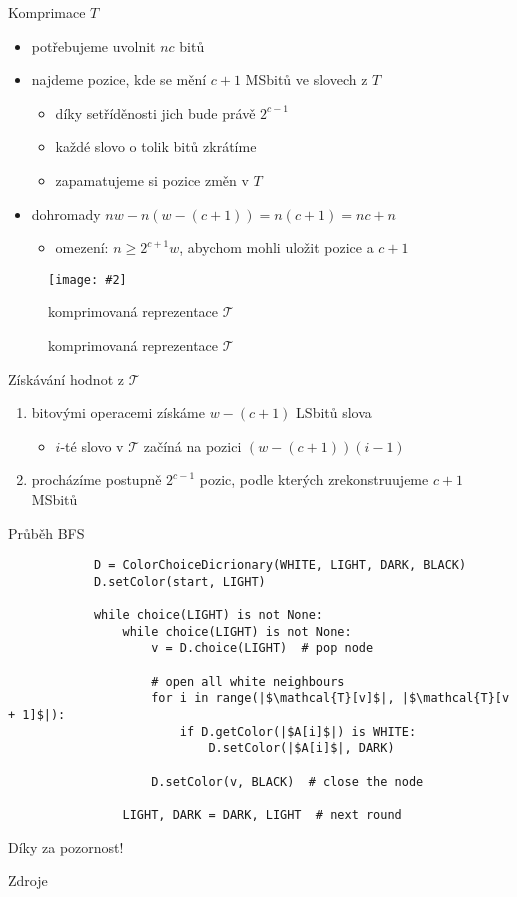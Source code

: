 \documentclass{beamer}
\makeatletter
\newcommand{\fitimage}[2][\@nil]{
	\begin{figure}
		\begin{adjustbox}{width=0.9\textwidth, totalheight=\textheight-2\baselineskip-2\baselineskip,keepaspectratio}
			\texttt{[image: \#2]}
		\end{adjustbox}
		\def\tmp{#1}%
	 \ifx\tmp\@nnil
			\else
			\caption{#1}
		\fi
	\end{figure}
}
\makeatother
\begin{document}
	\begin{frame}{Komprimace $T$}
		\begin{itemize}
			\item potřebujeme uvolnit $nc$ bitů
				\vfill
			\item najdeme pozice, kde se mění $c + 1$ MSbitů ve slovech z $T$
			\begin{itemize}
				\item díky setříděnosti jich bude právě $2^{c - 1}$
				\item každé slovo o tolik bitů zkrátíme
				\item zapamatujeme si pozice změn v $T$
			\end{itemize}
				\vfill
			\item dohromady $nw - n(w - (c + 1)) = n(c + 1) = nc + n$
			\begin{itemize}
				\item omezení: $n \ge 2^{c + 1}w$, abychom mohli uložit pozice a $c + 1$
			\end{itemize}
		\end{itemize}

		\fitimage[komprimovaná reprezentace $\mathcal{T}$]{images/compression.png}
	\end{frame}

	\begin{frame}{Získávání hodnot z $\mathcal{T}$}
		\begin{enumerate}
			\item bitovými operacemi získáme $w - (c + 1)$ LSbitů slova
			\begin{itemize}
				\item $i$-té slovo v $\mathcal{T}$ začíná na pozici $(w - (c + 1))(i - 1)$
			\end{itemize}
			\item procházíme postupně $2^{c - 1}$ pozic, podle kterých zrekonstruujeme $c + 1$ MSbitů
		\end{enumerate}
	\end{frame}


	\begin{frame}[fragile]{Průběh BFS}
		\small
		\begin{verbatim}
			D = ColorChoiceDicrionary(WHITE, LIGHT, DARK, BLACK)
			D.setColor(start, LIGHT)

			while choice(LIGHT) is not None:
				while choice(LIGHT) is not None:
					v = D.choice(LIGHT)  # pop node

					# open all white neighbours
					for i in range(|$\mathcal{T}[v]$|, |$\mathcal{T}[v + 1]$|):
						if D.getColor(|$A[i]$|) is WHITE:
							D.setColor(|$A[i]$|, DARK)

					D.setColor(v, BLACK)  # close the node

				LIGHT, DARK = DARK, LIGHT  # next round
		\end{verbatim}
	\end{frame}

	\begin{frame}[focus]
		Díky za pozornost!
	\end{frame}
	
	\appendix
	\begin{frame}{Zdroje}
		\nocite{*}
		
		
	\end{frame}
\end{document}
